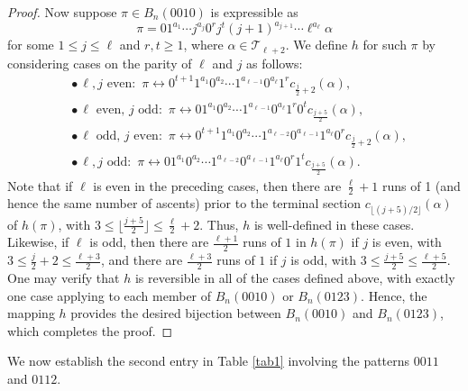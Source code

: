 \documentclass{article}
\theoremstyle{remark}
\theoremstyle{plain}
\begin{document}
\begin{proof}
Now suppose $\pi \in B_n(0010)$ is expressible as
$$\pi=01^{a_1}\cdots j^{a_j}0^rj^t(j+1)^{a_{j+1}}\cdots\ell^{a_\ell}\alpha$$
for some $1 \leq j \leq \ell$ and $r,t \geq 1$, where $\alpha \in \mathcal{T}_{\ell+2}$.  We define $h$ for such $\pi$ by considering cases on the parity of $\ell$ and $j$ as follows:
\begin{align*}
&\bullet\,\ell,j \text{ even:}\,\,\, \pi \leftrightarrow 0^{t+1}1^{a_1}0^{a_2}\cdots1^{a_{\ell-1}}0^{a_\ell}1^rc_{\frac{j}{2}+2}(\alpha), \\
&\bullet\,\ell \text{ even,}\,\,j \text{ odd:}\,\,\, \pi \leftrightarrow 01^{a_1}0^{a_2}\cdots1^{a_{\ell-1}}0^{a_\ell}1^r0^tc_{\frac{j+5}{2}}(\alpha), \\
&\bullet\,\ell \text{ odd,}\,\,j \text{ even:}\,\,\, \pi \leftrightarrow 0^{t+1}1^{a_1}0^{a_2}\cdots1^{a_{\ell-2}}0^{a_{\ell-1}}1^{a_\ell}0^rc_{\frac{j}{2}+2}(\alpha),\\
&\bullet\,\ell,j \text{ odd:}\,\,\, \pi \leftrightarrow 01^{a_1}0^{a_2}\cdots1^{a_{\ell-2}}0^{a_{\ell-1}}1^{a_\ell}0^r1^tc_{\frac{j+5}{2}}(\alpha).
\end{align*}
Note that if $\ell$ is even in the preceding cases, then there are $\frac{\ell}{2}+1$ runs of 1 (and hence the same number of ascents) prior to the terminal section $c_{\lfloor(j+5)/2\rfloor}(\alpha)$ of $h(\pi)$, with $3 \leq \lfloor\frac{j+5}{2}\rfloor \leq \frac{\ell}{2}+2$. Thus, $h$ is well-defined in these cases.  Likewise, if $\ell$ is odd, then there are $\frac{\ell+1}{2}$ runs of $1$ in $h(\pi)$ if $j$ is even, with $3 \leq \frac{j}{2}+2 \leq \frac{\ell+3}{2}$, and there are $\frac{\ell+3}{2}$ runs of $1$ if $j$ is odd, with $3 \leq \frac{j+5}{2} \leq \frac{\ell+5}{2}$.  One may verify that $h$ is reversible in all of the cases defined above, with exactly one case applying to each member of $B_n(0010)$ or $B_n(0123)$.  Hence, the mapping $h$ provides the desired bijection between $B_n(0010)$ and $B_n(0123)$, which completes the proof.
\end{proof}

We now establish the second entry in Table \ref{tab1} involving the patterns $0011$ and $0112$.
\end{document}
